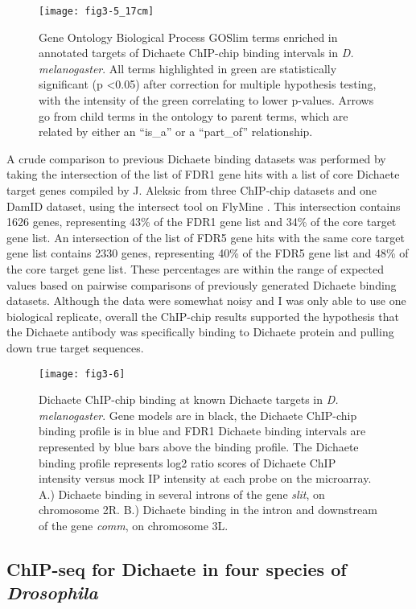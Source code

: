 \begin{figure}
\centering
\texttt{[image: fig3-5\_17cm]}
\caption{Gene Ontology Biological Process GOSlim terms enriched in annotated targets of Dichaete ChIP-chip binding intervals in \emph{D. melanogaster}. All terms highlighted in green are statistically significant (p \textless 0.05) after correction for multiple hypothesis testing, with the intensity of the green correlating to lower p-values. Arrows go from child terms in the ontology to parent terms, which are related by either an “is\_a” or a “part\_of” relationship.}
\label{Figure 3.5}
\end{figure}

A crude comparison to previous Dichaete binding datasets was performed by taking the intersection of the list of FDR1 gene hits with a list of core Dichaete target genes compiled by J. Aleksic from three ChIP-chip datasets and one DamID dataset, using the intersect tool on FlyMine \citep{aleksic_role_2013,lyne_flymine:_2007}. This intersection contains 1626 genes, representing 43\% of the FDR1 gene list and 34\% of the core target gene list. An intersection of the list of FDR5 gene hits with the same core target gene list contains 2330 genes, representing 40\% of the FDR5 gene list and 48\% of the core target gene list. These percentages are within the range of expected values based on pairwise comparisons of previously generated Dichaete binding datasets. Although the data were somewhat noisy and I was only able to use one biological replicate, overall the ChIP-chip results supported the hypothesis that the Dichaete antibody was specifically binding to Dichaete protein and pulling down true target sequences.

\begin{figure}
\centering
\texttt{[image: fig3-6]}
\caption{Dichaete ChIP-chip binding at known Dichaete targets in \emph{D. melanogaster}. Gene models are in black, the Dichaete ChIP-chip binding profile is in blue and FDR1 Dichaete binding intervals are represented by blue bars above the binding profile. The Dichaete binding profile represents log2 ratio scores of Dichaete ChIP intensity versus mock IP intensity at each probe on the microarray. A.) Dichaete binding in several introns of the gene \emph{slit}, on chromosome 2R. B.) Dichaete binding in the intron and downstream of the gene \emph{comm}, on chromosome 3L.}
\label{Figure 3.6}
\end{figure}

\subsection{ChIP-seq for Dichaete in four species of \emph{Drosophila}}
